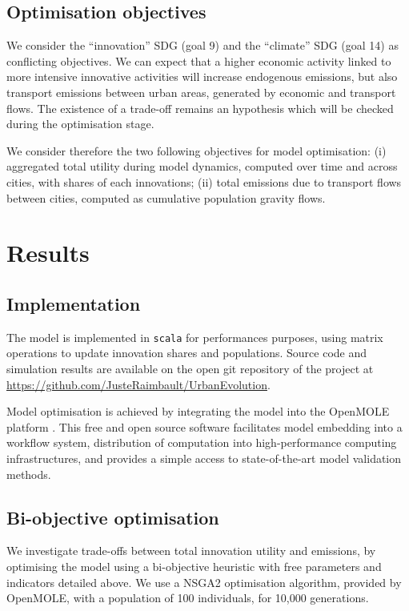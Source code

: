 \documentclass{article}
\begin{document}
\subsection{Optimisation objectives}

We consider the ``innovation'' SDG (goal 9) and the ``climate'' SDG (goal 14) as conflicting objectives. We can expect that a higher economic activity linked to more intensive innovative activities will increase endogenous emissions, but also transport emissions between urban areas, generated by economic and transport flows. The existence of a trade-off remains an hypothesis which will be checked during the optimisation stage.

We consider therefore the two following objectives for model optimisation: (i) aggregated total utility during model dynamics, computed over time and across cities, with shares of each innovations; (ii) total emissions due to transport flows between cities, computed as cumulative population gravity flows.


\section{Results}

\subsection{Implementation}

The model is implemented in \texttt{scala} for performances purposes, using matrix operations to update innovation shares and populations. Source code and simulation results are available on the open git repository of the project at \url{https://github.com/JusteRaimbault/UrbanEvolution}.

Model optimisation is achieved by integrating the model into the OpenMOLE platform \cite{reuillon2013openmole}. This free and open source software facilitates model embedding into a workflow system, distribution of computation into high-performance computing infrastructures, and provides a simple access to state-of-the-art model validation methods.


\subsection{Bi-objective optimisation}

We investigate trade-offs between total innovation utility and emissions, by optimising the model using a bi-objective heuristic with free parameters and indicators detailed above. We use a NSGA2 optimisation algorithm, provided by OpenMOLE, with a population of 100 individuals, for 10,000 generations.
\end{document}
